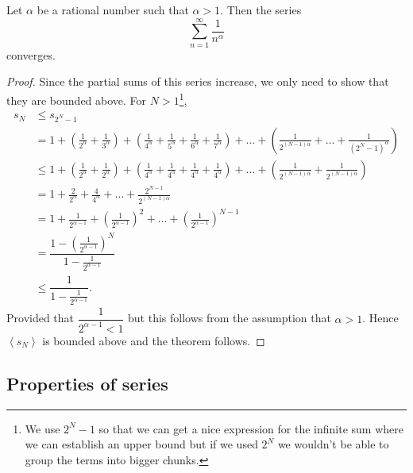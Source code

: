 \documentclass[10pt, a4paper]{article}
\newcommand{\sumfrto}[3][n = 1]{\sum_{#1}^{#2}{#3}} %
\newcommand{\sumto}[2][\infty]{\sumfrto{#1}{#2}}
\newcommand{\seq}[1][x_n]{\left\langle #1 \right\rangle}
\begin{document}
\begin{theorem}
    Let $\alpha$ be a rational number such that $\alpha > 1$. Then the series
    \[
    \sumto{\frac{1}{n ^ \alpha}}
    \]
    converges.
    \begin{proof}
        Since the partial sums of this series increase, we only need to show that they are bounded above. For $N > 1$\footnote{We use $2 ^ N - 1$ so that we can get a nice expression for the infinite sum where we can establish an upper bound but if we used $2 ^ N$ we wouldn't be able to group the terms into bigger chunks.},
        \begin{align*}
            s_N &\leq s_{2 ^ N - 1} \\
            &= 1 + \left(\frac{1}{2 ^ \alpha} + \frac{1}{3 ^ \alpha}\right) + \left(\frac{1}{4 ^ \alpha} + \frac{1}{5 ^ \alpha} + \frac{1}{6 ^ \alpha} + \frac{1}{7 ^ \alpha}\right) + \dotsc + \left(\frac{1}{2 ^ {(N - 1)\alpha}} + \dotsc + \frac{1}{(2 ^ N - 1) ^ \alpha}\right) \\
            &\leq 1 + \left(\frac{1}{2 ^ \alpha} + \frac{1}{2 ^ \alpha}\right) + \left(\frac{1}{4 ^ \alpha} + \frac{1}{4 ^ \alpha} + \frac{1}{4 ^ \alpha} + \frac{1}{4 ^ \alpha}\right) + \dotsc + \left(\frac{1}{2 ^ {(N - 1)\alpha}} + \frac{1}{2 ^ {(N - 1)\alpha}}\right) \\
            &= 1 + \frac{2}{2 ^ \alpha} + \frac{4}{4 ^ \alpha} + \dotsc + \frac{2 ^ {N - 1}}{2 ^ {(N - 1)\alpha}} \\
            &= 1 + \frac{1}{2 ^ {\alpha - 1}} + \left(\frac{1}{2 ^ {\alpha - 1}}\right) ^ 2 + \dotsc + \left(\frac{1}{2 ^ {\alpha - 1}}\right) ^ {N - 1} \\
            &= \dfrac{1 - \left(\frac{1}{2 ^ {\alpha - 1}}\right) ^ N}{1 - \frac{1}{2 ^ {\alpha - 1}}} \\
            &\leq \dfrac{1}{1 - \frac{1}{2 ^ {\alpha - 1}}}.
        \end{align*}
        Provided that $\dfrac{1}{2 ^ {\alpha - 1} < 1}$ but this follows from the assumption that $\alpha > 1$. Hence $\seq[s_N]$ is bounded above and the theorem follows.
    \end{proof}
\end{theorem}

\subsection{Properties of series}
\end{document}
